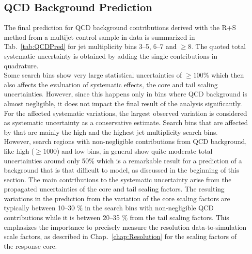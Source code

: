 \subsection{QCD Background Prediction}
\label{subsec:RA2_qcd_pred}
The final prediction for QCD background contributions derived with the R+S method from a multijet control sample in data is summarized in Tab.~\ref{tab:QCDPred} for jet multiplicity bins 3--5, 6--7 and $\ge 8$. The quoted total systematic uncertainty is obtained by adding the single contributions in quadrature. \\
Some search bins show very large statistical uncertainties of $\geq 100 \%$ which then also affects the evaluation of systematic effects, \eg the core and tail scaling uncertainties. However, since this happens only in bins where QCD background is almost negligible, it does not impact the final result of the analysis significantly. For the affected systematic variations, the largest observed variation is considered as systematic uncertainty as a conservative estimate. Search bins that are affected by that are mainly the high \MHT and the highest jet multiplicity search bins. \\
However, search regions with non-negligible contributions from QCD background, like high \HT ($\ge 1000$\gev) and low \MHT bins, in general show quite moderate total uncertainties around only 50\% which is a remarkable result for a prediction of a background that is that difficult to model, as discussed in the beginning of this section. The main contributions to the systematic uncertainty arise from the propagated uncertainties of the core and tail scaling factors. The resulting variations in the prediction from the variation of the core scaling factors are typically between 10--30 $\%$ in the search bins with non-negligible QCD contributions while it is between 20--35 $\%$ from the tail scaling factors. This emphasizes the importance to precisely measure the resolution data-to-simulation scale factors, as described in Chap.~\ref{chap:Resolution} for the scaling factors of the response core. 
